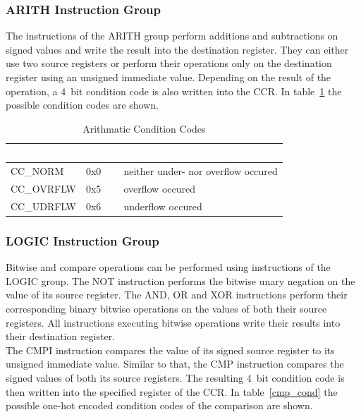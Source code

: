 \subsubsection{ARITH Instruction Group}

The instructions of the ARITH group perform additions and subtractions on signed values and write the result into the destination register.
They can either use two source registers or perform their operations only on the destination register using an unsigned immediate value.
Depending on the result of the operation, a 4~bit condition code is also written into the CCR.
In table~\ref{arith_cond} the possible condition codes are shown.

\begin{table}[htb]
\centering
\begin{tabular}{|l| l| l|}
    \hline
    \rowcolor{black!70}
    \textcolor{white}{\textbf{Identifier}} & \textcolor{white}{\textbf{Value}} & \textcolor{white}{\textbf{Description}} \\
    \hline
    CC\_NORM   & 0x0 & neither under- nor overflow occured \\
    \hline
    \rowcolor{black!10}
    CC\_OVRFLW & 0x5 & overflow occured \\
    \hline
    CC\_UDRFLW & 0x6 & underflow occured \\
    \hline
\end{tabular}
\caption{Arithmatic Condition Codes} \label{arith_cond}
\end{table}

\subsubsection{LOGIC Instruction Group}

Bitwise and compare operations can be performed using instructions of the LOGIC group.
The NOT instruction performs the bitwise unary negation on the value of its source register.
The AND, OR and XOR instructions perform their corresponding binary bitwise operations on the values of both their source registers.
All instructions executing bitwise operations write their results into their destination register.\\
The CMPI instruction compares the value of its signed source register to its unsigned immediate value.
Similar to that, the CMP instruction compares the signed values of both its source registers.
The resulting 4~bit condition code is then written into the specified register of the CCR.
In table~\ref{cmp_cond} the possible one-hot encoded condition codes of the comparison are shown.

